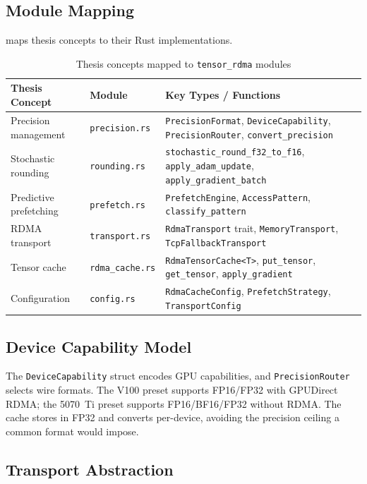 \documentclass[11pt,letterpaper]{article}
\theoremstyle{definition}
\begin{document}
\subsection{Module Mapping}

 maps thesis concepts to their Rust implementations.

\begin{table}[htbp]
\centering
\caption{Thesis concepts mapped to \texttt{tensor\_rdma} modules}
\label{tab:module-mapping}
\begin{tabular}{@{}llp{6cm}@{}}
\toprule
\textbf{Thesis Concept} & \textbf{Module} & \textbf{Key Types / Functions} \\
\midrule
Precision management & \texttt{precision.rs} & \texttt{PrecisionFormat}, \texttt{DeviceCapability}, \texttt{PrecisionRouter}, \texttt{convert\_precision} \\
Stochastic rounding & \texttt{rounding.rs} & \texttt{stochastic\_round\_f32\_to\_f16}, \texttt{apply\_adam\_update}, \texttt{apply\_gradient\_batch} \\
Predictive prefetching & \texttt{prefetch.rs} & \texttt{PrefetchEngine}, \texttt{AccessPattern}, \texttt{classify\_pattern} \\
RDMA transport & \texttt{transport.rs} & \texttt{RdmaTransport} trait, \texttt{MemoryTransport}, \texttt{TcpFallbackTransport} \\
Tensor cache & \texttt{rdma\_cache.rs} & \texttt{RdmaTensorCache<T>}, \texttt{put\_tensor}, \texttt{get\_tensor}, \texttt{apply\_gradient} \\
Configuration & \texttt{config.rs} & \texttt{RdmaCacheConfig}, \texttt{PrefetchStrategy}, \texttt{TransportConfig} \\
\bottomrule
\end{tabular}
\end{table}

\subsection{Device Capability Model}

The \texttt{DeviceCapability} struct encodes GPU capabilities, and \texttt{PrecisionRouter} selects wire formats. The V100 preset supports FP16/FP32 with GPUDirect RDMA; the 5070~Ti preset supports FP16/BF16/FP32 without RDMA. The cache stores in FP32 and converts per-device, avoiding the precision ceiling a common format would impose.

\subsection{Transport Abstraction}
\end{document}
